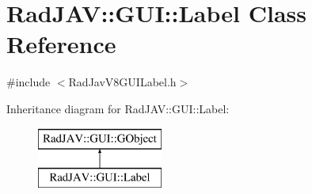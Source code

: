 \hypertarget{class_rad_j_a_v_1_1_g_u_i_1_1_label}{}\section{Rad\+J\+AV\+:\+:G\+UI\+:\+:Label Class Reference}
\label{class_rad_j_a_v_1_1_g_u_i_1_1_label}


{\ttfamily \#include $<$Rad\+Jav\+V8\+G\+U\+I\+Label.\+h$>$}

Inheritance diagram for Rad\+J\+AV\+:\+:G\+UI\+:\+:Label\+:\begin{figure}[H]
\begin{center}
\leavevmode
\includegraphics[height=2.000000cm]{class_rad_j_a_v_1_1_g_u_i_1_1_label}
\end{center}
\end{figure}
